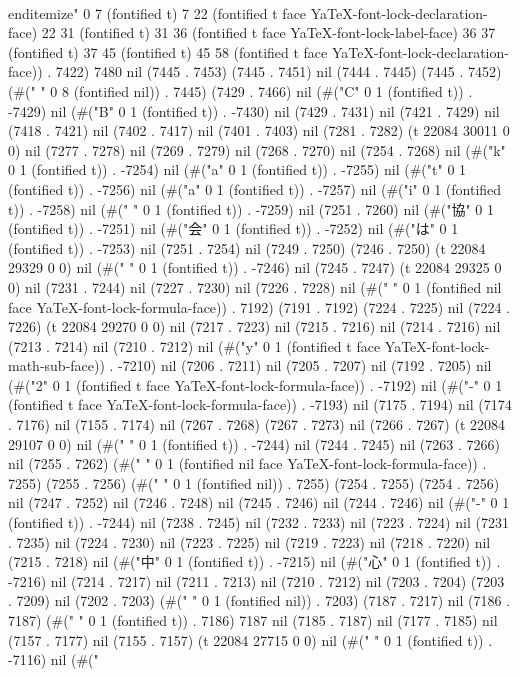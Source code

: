        \\end{itemize}" 0 7 (fontified t) 7 22 (fontified t face YaTeX-font-lock-declaration-face) 22 31 (fontified t) 31 36 (fontified t face YaTeX-font-lock-label-face) 36 37 (fontified t) 37 45 (fontified t) 45 58 (fontified t face YaTeX-font-lock-declaration-face)) . 7422) 7480 nil (7445 . 7453) (7445 . 7451) nil (7444 . 7445) (7445 . 7452) (#("        " 0 8 (fontified nil)) . 7445) (7429 . 7466) nil (#("C" 0 1 (fontified t)) . -7429) nil (#("B" 0 1 (fontified t)) . -7430) nil (7429 . 7431) nil (7421 . 7429) nil (7418 . 7421) nil (7402 . 7417) nil (7401 . 7403) nil (7281 . 7282) (t 22084 30011 0 0) nil (7277 . 7278) nil (7269 . 7279) nil (7268 . 7270) nil (7254 . 7268) nil (#("k" 0 1 (fontified t)) . -7254) nil (#("a" 0 1 (fontified t)) . -7255) nil (#("t" 0 1 (fontified t)) . -7256) nil (#("a" 0 1 (fontified t)) . -7257) nil (#("i" 0 1 (fontified t)) . -7258) nil (#(" " 0 1 (fontified t)) . -7259) nil (7251 . 7260) nil (#("協" 0 1 (fontified t)) . -7251) nil (#("会" 0 1 (fontified t)) . -7252) nil (#("は" 0 1 (fontified t)) . -7253) nil (7251 . 7254) nil (7249 . 7250) (7246 . 7250) (t 22084 29329 0 0) nil (#(" " 0 1 (fontified t)) . -7246) nil (7245 . 7247) (t 22084 29325 0 0) nil (7231 . 7244) nil (7227 . 7230) nil (7226 . 7228) nil (#(" " 0 1 (fontified nil face YaTeX-font-lock-formula-face)) . 7192) (7191 . 7192) (7224 . 7225) nil (7224 . 7226) (t 22084 29270 0 0) nil (7217 . 7223) nil (7215 . 7216) nil (7214 . 7216) nil (7213 . 7214) nil (7210 . 7212) nil (#("y" 0 1 (fontified t face YaTeX-font-lock-math-sub-face)) . -7210) nil (7206 . 7211) nil (7205 . 7207) nil (7192 . 7205) nil (#("2" 0 1 (fontified t face YaTeX-font-lock-formula-face)) . -7192) nil (#("-" 0 1 (fontified t face YaTeX-font-lock-formula-face)) . -7193) nil (7175 . 7194) nil (7174 . 7176) nil (7155 . 7174) nil (7267 . 7268) (7267 . 7273) nil (7266 . 7267) (t 22084 29107 0 0) nil (#(" " 0 1 (fontified t)) . -7244) nil (7244 . 7245) nil (7263 . 7266) nil (7255 . 7262) (#(" " 0 1 (fontified nil face YaTeX-font-lock-formula-face)) . 7255) (7255 . 7256) (#(" " 0 1 (fontified nil)) . 7255) (7254 . 7255) (7254 . 7256) nil (7247 . 7252) nil (7246 . 7248) nil (7245 . 7246) nil (7244 . 7246) nil (#("-" 0 1 (fontified t)) . -7244) nil (7238 . 7245) nil (7232 . 7233) nil (7223 . 7224) nil (7231 . 7235) nil (7224 . 7230) nil (7223 . 7225) nil (7219 . 7223) nil (7218 . 7220) nil (7215 . 7218) nil (#("中" 0 1 (fontified t)) . -7215) nil (#("心" 0 1 (fontified t)) . -7216) nil (7214 . 7217) nil (7211 . 7213) nil (7210 . 7212) nil (7203 . 7204) (7203 . 7209) nil (7202 . 7203) (#(" " 0 1 (fontified nil)) . 7203) (7187 . 7217) nil (7186 . 7187) (#(" " 0 1 (fontified t)) . 7186) 7187 nil (7185 . 7187) nil (7177 . 7185) nil (7157 . 7177) nil (7155 . 7157) (t 22084 27715 0 0) nil (#(" " 0 1 (fontified t)) . -7116) nil (#("
